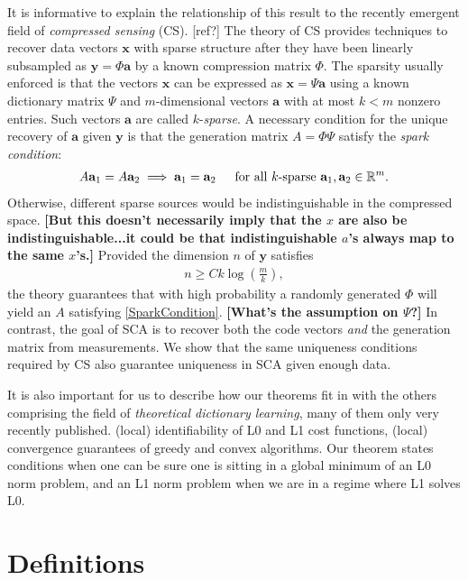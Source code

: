 \documentclass[journal,onecolumn]{IEEEtran}
\begin{document}
It is informative to explain the relationship of this result to the recently emergent field of \emph{compressed sensing} (CS). [ref?] The theory of CS provides techniques to recover data vectors $\mathbf{x}$ with sparse structure after they have been linearly subsampled as $\mathbf{y} = \Phi \mathbf{a}$ by a known compression matrix $\Phi$. The sparsity usually enforced is that the vectors $\mathbf{x}$ can be expressed as $\mathbf{x} = \Psi\mathbf{a}$ using a known dictionary matrix $\Psi$ and $m$-dimensional vectors $\mathbf{a}$ with at most $k < m$ nonzero entries. Such vectors $\mathbf{a}$ are called $k$-\emph{sparse}. A necessary condition for the unique recovery of $\mathbf{a}$ given $\mathbf{y}$ is that the generation matrix $A = \Phi\Psi$ satisfy the \emph{spark condition}:
\begin{align}\label{SparkCondition}
A\mathbf{a}_1 = A\mathbf{a}_2 \implies \mathbf{a}_1 = \mathbf{a}_2 \indent \text{for all $k$-sparse } \mathbf{a}_1, \mathbf{a}_2 \in \mathbb{R}^m.
\end{align}
Otherwise, different sparse sources would be indistinguishable in the compressed space. \textbf{[But this doesn't necessarily imply that the $x$ are also be indistinguishable...it could be that indistinguishable $a$'s always map to the same $x$'s.]} Provided the dimension $n$ of $\mathbf{y}$ satisfies
\begin{align}\label{CScondition}
n \geq Ck\log\left(\frac{m}{k}\right),
\end{align}
%
the theory guarantees that with high probability a randomly generated $\Phi$ will yield an $A$ satisfying \eqref{SparkCondition}. \textbf{[What's the assumption on $\Psi$?]} In contrast, the goal of SCA is to recover both the code vectors \emph{and} the generation matrix from measurements. We show that the same uniqueness conditions required by CS also guarantee uniqueness in SCA given enough data.

It is also important for us to describe how our theorems fit in with the others comprising the field of \emph{theoretical dictionary learning}, many of them only very recently published. (local) identifiability of L0 and L1 cost functions, (local) convergence guarantees of greedy and convex algorithms. Our theorem states conditions when one can be sure one is sitting in a global minimum of an L0 norm problem, and an L1 norm problem when we are in a regime where L1 solves L0. 

\section{Definitions}
\end{document}
